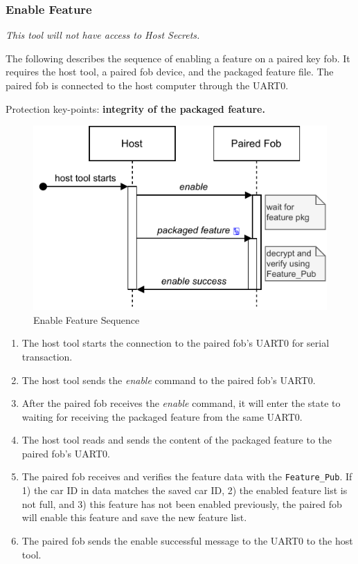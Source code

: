 \documentclass[11pt,oneside,onecolumn,letterpaper]{article}
\begin{document}
\subsubsection{Enable Feature}

\textit{This tool will not have access to Host Secrets.}

The following describes the sequence of enabling a feature on a paired key fob. It requires the host tool, a paired fob device, and the packaged feature file. The paired fob is connected to the host computer through the UART0.

Protection key-points: \textbf{integrity of the packaged feature.}

\begin{figure}[!htbp]
	\begin{centering}
		\includegraphics[width = .5\textwidth]{pic/enable.pdf}
		\caption{Enable Feature Sequence}
		\label{fig:enable}
	\end{centering}
\end{figure}

\begin{enumerate}
	\item The host tool starts the connection to the paired fob's UART0 for serial transaction.
	\item The host tool sends the \textit{enable} command to the paired fob's UART0.
	\item After the paired fob receives the \textit{enable} command, it will enter the state to waiting for receiving the packaged feature from the same UART0.
	\item The host tool reads and sends the content of the packaged feature to the paired fob's UART0.
	\item The paired fob receives and verifies the feature data with the \verb|Feature_Pub|. If 1) the car ID in data matches the saved car ID, 2) the enabled feature list is not full, and 3) this feature has not been enabled previously, the paired fob will enable this feature and save the new feature list.
	\item The paired fob sends the enable successful message to the UART0 to the host tool.
\end{enumerate}
\end{document}
